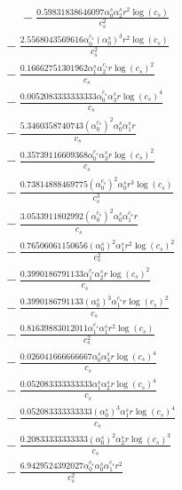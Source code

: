 \documentclass[10pt]{article}
\begin{document}
\begin{align*}
\phantom{R_{1,6}} &\phantom{={}}{}  - \frac{0.59831838646097 \alpha_{0}^s \alpha_{2}^s r^{2} \log{\left(c_{s} \right)}}{c_{s}^{2}} \\
&{}  - \frac{2.5568043569616 \alpha_{0}^{c_s} \left(\alpha_{0}^s\right)^{3} r^{2} \log{\left(c_{s} \right)}}{c_{s}^{2}} \\
&{}  - \frac{0.16662751301962 \alpha_{1}^s \alpha_{2}^{c_s} r \log{\left(c_{s} \right)}^{2}}{c_{s}} \\
&{}  - \frac{0.0052083333333333 \alpha_{0}^{c_s} \alpha_{3}^s r \log{\left(c_{s} \right)}^{4}}{c_{s}} \\
&{}  - \frac{5.3460358740743 \left(\alpha_{0}^{c_s}\right)^{2} \alpha_{0}^s \alpha_{1}^s r}{c_{s}} \\
&{}  - \frac{0.35739116609368 \alpha_{0}^{c_s} \alpha_{3}^s r \log{\left(c_{s} \right)}^{2}}{c_{s}} \\
&{}  - \frac{0.73814888469775 \left(\alpha_{0}^{c_s}\right)^{2} \alpha_{0}^s r^{3} \log{\left(c_{s} \right)}}{c_{s}^{3}} \\
&{}  - \frac{3.0533911802992 \left(\alpha_{0}^{c_s}\right)^{2} \alpha_{0}^s \alpha_{1}^{c_s} r}{c_{s}} \\
&{}  - \frac{0.76506061150656 \left(\alpha_{0}^s\right)^{2} \alpha_{1}^s r^{2} \log{\left(c_{s} \right)}^{2}}{c_{s}^{2}} \\
&{}  - \frac{0.3990186791133 \alpha_{1}^{c_s} \alpha_{2}^s r \log{\left(c_{s} \right)}^{2}}{c_{s}} \\
&{}  - \frac{0.3990186791133 \left(\alpha_{0}^s\right)^{3} \alpha_{1}^{c_s} r \log{\left(c_{s} \right)}^{2}}{c_{s}} \\
&{}  - \frac{0.81639883012011 \alpha_{1}^{c_s} \alpha_{1}^s r^{2} \log{\left(c_{s} \right)}}{c_{s}^{2}} \\
&{}  - \frac{0.026041666666667 \alpha_{0}^s \alpha_{3}^s r \log{\left(c_{s} \right)}^{4}}{c_{s}} \\
&{}  - \frac{0.052083333333333 \alpha_{1}^s \alpha_{2}^s r \log{\left(c_{s} \right)}^{4}}{c_{s}} \\
&{}  - \frac{0.052083333333333 \left(\alpha_{0}^s\right)^{3} \alpha_{1}^s r \log{\left(c_{s} \right)}^{4}}{c_{s}} \\
&{}  - \frac{0.20833333333333 \left(\alpha_{0}^s\right)^{2} \alpha_{2}^s r \log{\left(c_{s} \right)}^{3}}{c_{s}} \\
&{}  - \frac{6.9429524392027 \alpha_{0}^{c_s} \alpha_{0}^s \alpha_{1}^{c_s} r^{2}}{c_{s}^{2}} \\

\end{align*}
\end{document}

